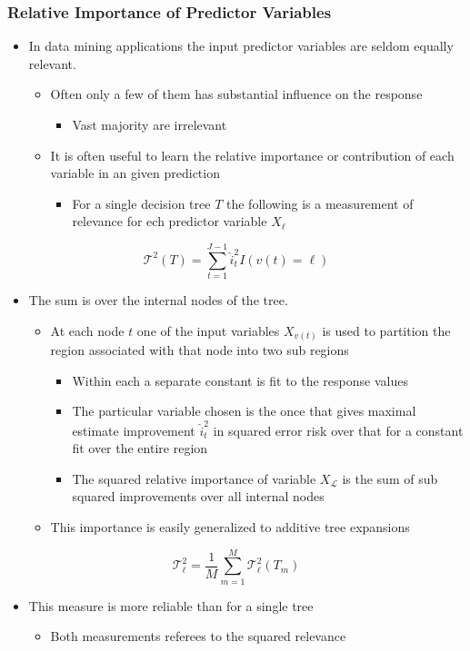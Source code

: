 \documentclass[11pt]{article}
\begin{document}
\subsubsection{Relative Importance of Predictor Variables}
\label{sec:orgd989446}
\begin{itemize}
\item In data mining applications the input predictor variables are seldom equally relevant.
\begin{itemize}
\item Often only a few of them has substantial influence on the response
\begin{itemize}
\item Vast majority are irrelevant
\end{itemize}
\item It is often useful to learn the relative importance or contribution of each variable in an given prediction
\begin{itemize}
\item For a single decision tree \(T\) the following is a measurement of relevance for ech predictor variable \(X_\ell\)
\end{itemize}
\end{itemize}
\end{itemize}
\begin{equation}
  \mathcal{T}^2(T) = \sum_{t=1}^{J-1}\hat i_t^2 I(v(t) = \ell)
\end{equation}  
\begin{itemize}
\item The sum is over the internal nodes of the tree.
\begin{itemize}
\item At each node \(t\) one of the input variables \(X_{v(t)}\) is used to partition the  region associated with that node into two sub regions
\begin{itemize}
\item Within each a separate constant is fit to the response values
\item The particular variable chosen is the once that gives maximal estimate improvement \(\hat i_t^2\) in squared error risk over that for a constant fit over the entire region
\item The squared relative importance of variable \(X_\mathcal L\) is the sum of sub squared improvements over all internal nodes
\end{itemize}
\item This importance is easily generalized to additive tree expansions
\end{itemize}
\end{itemize}
\begin{equation}
  \mathcal T^2_\ell = \frac1M \sum_{m=1}^M\mathcal T^2_\ell (T_m)
\end{equation}
\begin{itemize}
\item This measure is more reliable than for a single tree
\begin{itemize}
\item Both measurements referees to the squared relevance
\end{itemize}
\end{itemize}
\end{document}
